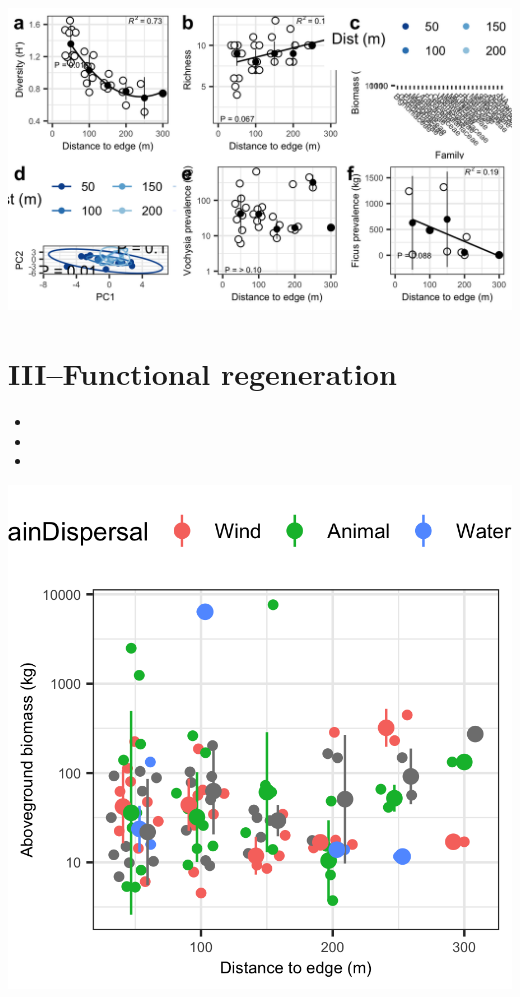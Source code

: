 \documentclass[
]{article}
\providecommand{\tightlist}{%
  \setlength{\itemsep}{0pt}\setlength{\parskip}{0pt}}
\begin{document}
\includegraphics{../figs/fig2.png}

\hypertarget{iiifunctional-regeneration}{%
\section{III--Functional
regeneration}\label{iiifunctional-regeneration}}

\begin{itemize}
\tightlist
\item
\item
\item
\end{itemize}

\includegraphics{../figs/fig3.png}
\end{document}

